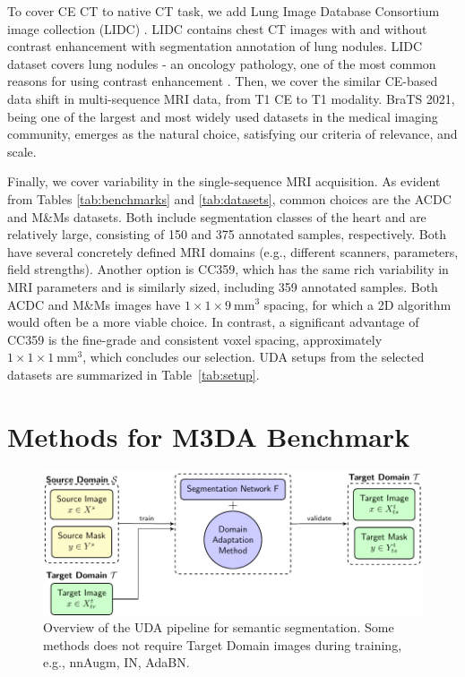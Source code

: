 To cover CE CT to native CT task, we add Lung Image Database Consortium image collection (LIDC) \cite{lidc}. LIDC contains chest CT images with and without contrast enhancement with segmentation annotation of lung nodules. LIDC dataset covers lung nodules - an oncology pathology, one of the most common reasons for using contrast enhancement \cite{purysko2016does}. Then, we cover the similar CE-based data shift in multi-sequence MRI data, from T1 CE to T1 modality. BraTS 2021, being one of the largest and most widely used datasets in the medical imaging community, emerges as the natural choice, satisfying our criteria of relevance, and scale.

Finally, we cover variability in the single-sequence MRI acquisition. As evident from Tables \ref{tab:benchmarks} and \ref{tab:datasets}, common choices are the ACDC and M\&Ms datasets. Both include segmentation classes of the heart and are relatively large, consisting of 150 and 375 annotated samples, respectively. Both have several concretely defined MRI domains (e.g., different scanners, parameters, field strengths). Another option is CC359, which has the same rich variability in MRI parameters and is similarly sized, including 359 annotated samples. Both ACDC and M\&Ms images have $1\times 1\times 9~ \text{mm}^3$ spacing, for which a 2D algorithm would often be a more viable choice. In contrast, a significant advantage of CC359 is the fine-grade and consistent voxel spacing, approximately $1\times 1\times 1~ \text{mm}^3$, which concludes our selection. UDA setups from the selected datasets are summarized in Table~\ref{tab:setup}.


\section{Methods for M3DA Benchmark}
\label{sec:methods}


\begin{figure}[!ht]
	\centering
	\includegraphics[width=1\columnwidth]{Dissertation/Figures/4_da_bench/uDA_pipeline.pdf}
	\caption{Overview of the UDA pipeline for semantic segmentation. Some methods does not require Target Domain images during training, e.g., nnAugm, IN, AdaBN.}
	\label{fig:pipeline}
\end{figure}

